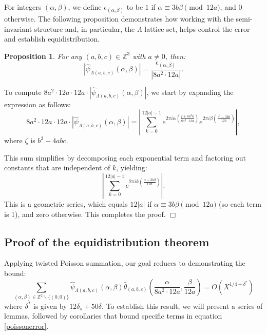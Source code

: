 \documentclass{article}
\newtheorem{proposition}[theorem]{Proposition}
\newenvironment{proof}{\noindent {\bf Proof:}}{$\Box$ \vspace{2 ex}}
\begin{document}
For integers $(\alpha, \beta)$, we define $\epsilon_{(\alpha, \beta)}$ to be $1$ if $\alpha \equiv 3b\beta \pmod{12a}$, and $0$ otherwise. The following proposition demonstrates how working with the semi-invariant structure and, in particular, the $\Lambda$ lattice set, helps control the error and establish equidistribution.
\begin{proposition}\label{Finte-part-coeff}
For any $(a,b,c)\in \mathbb{Z}^3$ with $a \neq 0$, then:
\begin{equation*}
|\widehat \psi_{\Lambda(a,b,c)}(\alpha,\beta)| = \frac{\epsilon_{(\alpha,\beta)}}{|8a^2 \cdot 12a|}.
\end{equation*}
\end{proposition}
\begin{proof}
To compute $8a^2 \cdot 12a \cdot 12a \cdot |\widehat{\psi}_{\Lambda(a, b, c)}(\alpha, \beta)|$, we start by expanding the expression as follows:
\begin{equation*}
8a^2 \cdot 12a \cdot 12a \cdot |\widehat{\psi}_{\Lambda(a, b, c)}(\alpha, \beta)| = \left|\sum_{k=0}^{12|a|-1} e^{2\pi i \alpha \left(\frac{\zeta + 8a^2 k}{8a^2 \cdot 12a}\right)} e^{2\pi i \beta \left(\frac{c^2 - 3b k}{12a}\right)}\right|,
\end{equation*}
where $\zeta$ is $b^3-4abc$.

This sum simplifies by decomposing each exponential term and factoring out constants that are independent of $k$, yielding:
\begin{equation*}
\left|\sum_{k=0}^{12|a|-1} e^{2\pi i k \left(\frac{\alpha - 3b \beta}{12a}\right)}\right|.
\end{equation*}
This is a geometric series, which equals $12|a|$ if $\alpha \equiv 3b \beta \pmod{12a}$ (so each term is $1$), and zero otherwise. This completes the proof.
\end{proof}

\subsection{Proof of the equidistribution theorem} 
Applying twisted Poisson summation, our goal reduces to demonstrating the bound:
\begin{equation}\label{poissonerror}
 \sum_{(\alpha,\beta)\in \mathbb{Z}^2  \backslash \{(0,0)\}} \widehat \psi_{\Lambda(a,b,c)}(\alpha,\beta)\widehat\theta_{(a,b,c)}\left(\frac{\alpha}{8a^2 \cdot 12a},\frac{\beta}{12a}\right) = O\left(X^{1/4+\delta^*}\right)
\end{equation}
where $\delta^*$ is given by $12\delta_s + 50\delta$. To establish this result, we will present a series of lemmas, followed by corollaries that bound specific terms in equation \eqref{poissonerror}.
\end{document}
